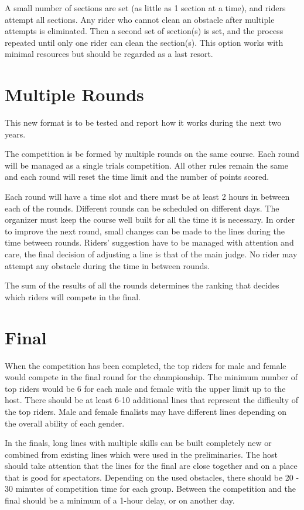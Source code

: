 A small number of sections are set (as little as 1 section at a time), and riders attempt all sections. 
Any rider who cannot clean an obstacle after multiple attempts is eliminated. 
Then a second set of section(s) is set, and the process repeated until only one rider can clean the section(s). 
This option works with minimal resources but should be regarded as a last resort.

\section{Multiple Rounds}
This new format is to be tested and report how it works during the next two years.

The competition is be formed by multiple rounds on the same course. 
Each round will be managed as a single trials competition. 
All other rules remain the same and each round will reset the time limit and the number of points scored. 

Each round will have a time slot and there must be at least 2 hours in between each of the rounds. 
Different rounds can be scheduled on different days.
The organizer must keep the course well built for all the time it is necessary. 
In order to improve the next round, small changes can be made to the lines during the time between rounds. 
Riders' suggestion have to be managed with attention and care, the final decision of adjusting a line is that of the main judge. 
No rider may attempt any obstacle during the time in between rounds.

The sum of the results of all the rounds determines the ranking that decides which riders will compete in the final.

\section{Final}

When the competition has been completed, the top riders for male and female would compete in the final round for the championship.
The minimum number of top riders would be 6 for each male and female with the upper limit up to the host. 
There should be at least 6-10 additional lines that represent the difficulty of the top riders. 
Male and female finalists may have different lines depending on the overall ability of each gender.

In the finals, long lines with multiple skills can be built completely new or combined from existing lines which were used in the preliminaries. 
The host should take attention that the lines for the final are close together and on a place that is good for spectators. Depending on the used obstacles, there should be 20 - 30 minutes of competition time for each group. 
Between the competition and the final should be a minimum of a 1-hour delay, or on another day.
 
